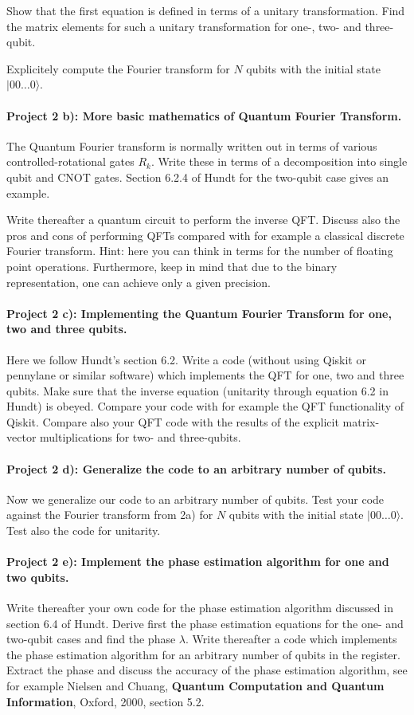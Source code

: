 \documentclass[%
oneside,                 %
final,                   %
10pt]{article}
\begin{document}
Show that the first equation is defined in terms of a unitary
transformation. Find the matrix elements for such a unitary
transformation for one-, two- and three-qubit.

Explicitely compute the Fourier transform for $N$ qubits with the initial state $\vert 00\dots 0\rangle$.

\paragraph{Project 2 b): More basic mathematics of  Quantum Fourier Transform.}
The Quantum Fourier transform is normally written out in terms of
various controlled-rotational gates $R_k$. Write these in terms of a
decomposition into single qubit and CNOT gates.  Section 6.2.4 of Hundt for the two-qubit case gives an example.

Write thereafter a quantum circuit to perform the inverse QFT.
Discuss also the pros and cons of performing QFTs compared with for example a classical discrete Fourier transform. Hint: here you can think in terms for the number of floating point operations. Furthermore, keep in mind that due to the binary representation, one can achieve only a given precision. 

\paragraph{Project 2 c): Implementing the Quantum Fourier Transform for one, two and three qubits.}
Here we follow Hundt's section 6.2. Write a code (without using Qiskit or pennylane or similar software) which implements the QFT
for one, two and three qubits. Make sure that the inverse equation (unitarity through equation 6.2 in Hundt) is obeyed. 
Compare your code with for example the QFT functionality of Qiskit.  Compare also your QFT code with the results of the explicit matrix-vector multiplications for two- and three-qubits.

\paragraph{Project 2 d): Generalize the code to an arbitrary number of qubits.}
Now we generalize our code to an arbitrary number of qubits. Test your
code against the Fourier transform from 2a) for $N$ qubits with the
initial state $\vert 00\dots 0\rangle$. Test also the code for unitarity.

\paragraph{Project 2 e): Implement the phase estimation algorithm for one and two qubits.}
Write thereafter your own code for the phase estimation algorithm
discussed in section 6.4 of Hundt. Derive first the phase estimation
equations for the one- and two-qubit cases and find the phase
$\lambda$. Write thereafter a code which implements the phase
estimation algorithm for an arbitrary number of qubits in the
register. Extract the phase and discuss the accuracy of the phase
estimation algorithm, see for example Nielsen and Chuang, \textbf{Quantum Computation and Quantum Information}, Oxford, 2000, section 5.2.
\end{document}

